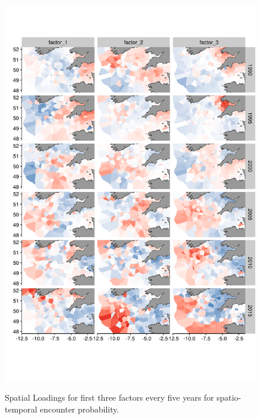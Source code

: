 \documentclass{article}
\begin{document}
\begin{figure}
\begin{center}
	\includegraphics[width = 0.8\linewidth]{"figures/Suppl - SpatioTempLoadingsEpsilon1"}
	\label{fig:S5}
	\caption{Spatial Loadings for first three factors every five years for
	spatio-temporal encounter probability.}
	\end{center}
\end{figure}
\end{document}
